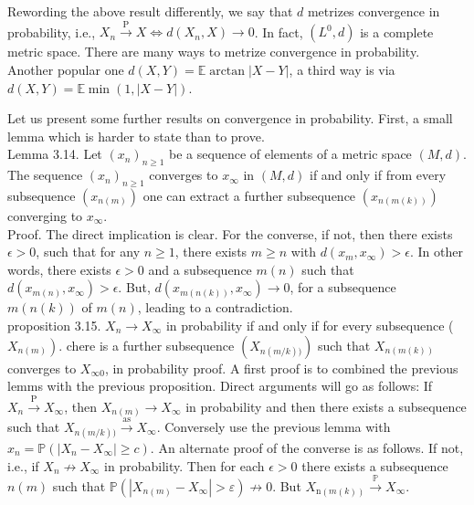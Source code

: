 \documentclass{amsbook}
\theoremstyle{plain}%
\theoremstyle{definition}
\theoremstyle{remark}
\begin{document}
      Rewording the above result differently, we say that $d$ metrizes convergence in probability, i.e., $X_{n} \xrightarrow{\mathrm{P}} X \Leftrightarrow d\left(X_{n}, X\right) \rightarrow 0$. In fact, $\left(L^{0}, d\right)$ is a complete metric space. There are many ways to metrize convergence in probability. Another popular one $d(X, Y)=\mathbb{E} \arctan |X-Y|$, a third way is via $d(X, Y)=\mathbb{E} \min (1,|X-Y|)$.

      Let us present some further results on convergence in probability. First, a small lemma which is harder to state than to prove.\\
      Lemma 3.14. Let $\left(x_{n}\right)_{n \geq 1}$ be a sequence of elements of a metric space $(M, d)$. The sequence $\left(x_{n}\right)_{n \geq 1}$ converges to $x_{\infty}$ in $(M, d)$ if and only if from every subsequence $\left(x_{n(m)}\right)$ one can extract a further subsequence $\left(x_{n(m(k))}\right)$ converging to $x_{\infty}$.\\
      Proof. The direct implication is clear. For the converse, if not, then there exists $\epsilon>0$, such that for any $n \geq 1$, there exists $m \geq n$ with $d\left(x_{m}, x_{\infty}\right)>\epsilon$. In other words, there exists $\epsilon>0$ and a subsequence $m(n)$ such that $d\left(x_{m(n)}, x_{\infty}\right)>\epsilon$. But, $d\left(x_{m(n(k))}, x_{\infty}\right) \rightarrow 0$, for a subsequence $m(n(k))$ of $m(n)$, leading to a contradiction.\\
  proposition 3.15. $X_{n} \rightarrow X_{\infty}$ in probability if and only if for every subsequence ( $\left.X_{n(m)}\right)$. chere is a further subsequence $\left(X_{n(m / k))}\right)$ such that $X_{n(m(k))}$ converges to $X_{\infty 0}$, in probability proof. A first proof is to combined the previous lemms with the previous proposition. Direct arguments will go as follows: If $X_{n} \xrightarrow{\mathrm{P}} X_{\infty}$, then $X_{n(m)} \rightarrow X_{\infty}$ in probability and then there exists a subsequence such that $X_{n(m / k))} \xrightarrow{\mathrm{as}} X_{\infty}$. Conversely use the previous lemma with $x_{n}=\mathbb{P}\left(\left|X_{n}-X_{\infty}\right| \geq c\right)$. An alternate proof of the converse is as follows. If not, i.e., if $X_{n} \nrightarrow X_{\infty}$ in probability. Then for each $\epsilon>0$ there exists a subsequence $n(m)$ such that $\mathbb{P}\left(\left|X_{n(m)}-X_{\infty}\right|>\varepsilon\right) \nrightarrow 0$. But $X_{\mathrm{n}(m(k))} \xrightarrow{\mathbb{P}} X_{\infty}$.
\end{document}
